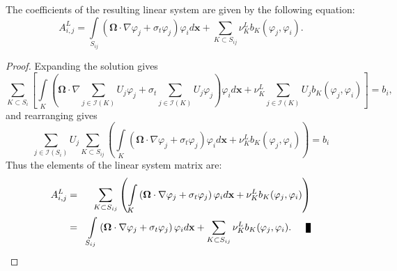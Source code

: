 \begin{lemma}
The coefficients of the resulting linear system are given by the following equation:
\begin{equation}\label{Aij}
	A^L_{i,j} = \int\limits_{S_{ij}}\left(\mathbf{\Omega}\cdot\nabla\varphi_j +
		\sigma_t\varphi_j\right)\varphi_i d\mathbf{x} +
		\sum\limits_{K\subset S_{ij}}\nu_K^L b_K(\varphi_j, \varphi_i).
\end{equation}
\end{lemma}

\begin{proof}
Expanding the solution gives
\[
	\sum\limits_{K\subset S_i}\left[\int\limits_K\left(\mathbf{\Omega}\cdot
      \nabla\sum\limits_{j\in \mathcal{I}(K)}U_j\varphi_j +
		\sigma_t\sum\limits_{j\in \mathcal{I}(K)}U_j\varphi_j\right)\varphi_i d\mathbf{x} +
		\nu_K^L \sum\limits_{j\in \mathcal{I}(K)}U_j b_K(\varphi_j, \varphi_i)\right] = b_i,
\]
and rearranging gives
\[
	\sum\limits_{j\in \mathcal{I}(S_{i})}U_j\sum\limits_{K\subset S_{ij}}
      \left(\int\limits_K\left(\mathbf{\Omega}\cdot\nabla\varphi_j +
		\sigma_t\varphi_j\right)\varphi_i d\mathbf{x} +
		\nu_K^L b_K(\varphi_j, \varphi_i)\right) = b_i
\]
Thus the elements of the linear system matrix are:
\begin{eqnarray*}
	A^L_{i,j} & = & \sum\limits_{K\subset S_{ij}}\left(\int\limits_K
      \left(\mathbf{\Omega}\cdot\nabla\varphi_j +
		\sigma_t\varphi_j\right)\varphi_i d\mathbf{x} +
		\nu_K^L b_K(\varphi_j, \varphi_i)\right)\\
  & = & \int\limits_{S_{ij}}\left(\mathbf{\Omega}\cdot\nabla\varphi_j +
		\sigma_t\varphi_j\right)\varphi_i d\mathbf{x} +
		\sum\limits_{K\subset S_{ij}}\nu_K^L b_K(\varphi_j, \varphi_i).\qed
\end{eqnarray*}
\end{proof}

